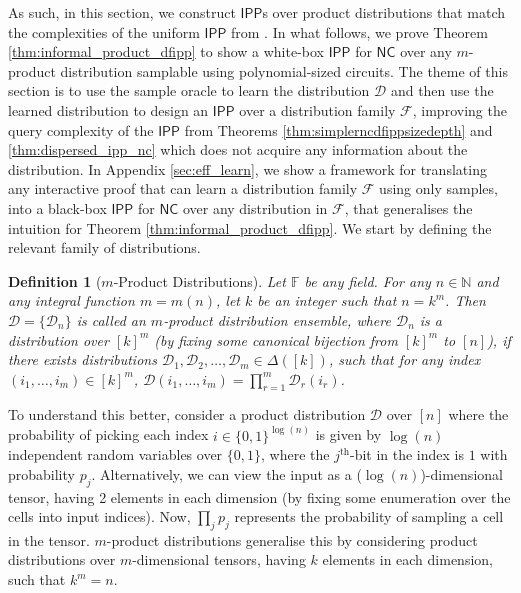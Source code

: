 \documentclass[11pt]{article}
\newtheorem{definition}{Definition}[section]
\newcommand{\NC}{\mathsf{NC}}
\newcommand{\IPP}{\mathsf{IPP}}
\newcommand{\F}{\mathbb{F}}
\newcommand{\N}{\mathbb{N}}
\newcommand{\sD}{\mathcal{D}}
\newcommand{\sF}{\mathcal{F}}
\begin{document}
As such, in this section, we construct $\IPP$s over product distributions that match the complexities of the uniform $\IPP$ from \cite{RVW}. In what follows, we prove Theorem \ref{thm:informal_product_dfipp} to show a white-box $\IPP$ for $\NC$ over any $m$-product distribution samplable using polynomial-sized circuits. The theme of this section is to use the sample oracle to learn the distribution $\sD$ and then use the learned distribution to design an $\IPP$ over a distribution family $\sF$, improving the query complexity of the $\IPP$ from Theorems \ref{thm:simplerncdfippsizedepth} and \ref{thm:dispersed_ipp_nc} which does not acquire any information about the distribution. In Appendix \ref{sec:eff_learn}, we show a framework for translating any interactive proof that can learn a distribution family $\sF$ using only samples, into a black-box $\IPP$ for $\NC$ over any distribution in $\sF$, that generalises the intuition for Theorem \ref{thm:informal_product_dfipp}. We start by defining the relevant family of distributions.


\begin{definition}[$m$-Product Distributions]
\label{def:prod_dist}
Let $\F$ be any field. For any $n \in \N$ and any integral function $m = m(n)$, let $k$ be an integer such that $n = k^m$. Then $\mathcal{D}=\{\sD_n\}$ is called an $m$-product distribution ensemble, where $\sD_n$ is a distribution over $[k]^m$ (by fixing some canonical bijection from $[k]^m$ to $[n]$), if there exists distributions $\sD_1, \sD_2, \dots, \sD_m \in \Delta([k])$, such that for any index $(i_1, \dots, i_m) \in [k]^m$, $\sD(i_1, \dots, i_m) = \prod_{r=1}^m \sD_r(i_r)$.
\end{definition}

To understand this better, consider a product distribution $\sD$ over $[n]$ where the probability of picking each index $i \in \{0,1\}^{\log(n)}$ is given by $\log(n)$ independent random variables over $\{0,1\}$, where the $j^{\text{th}}$-bit in the index is $1$ with probability $p_j$. Alternatively, we can view the input as a ($\log(n)$)-dimensional tensor, having 2 elements in each dimension (by fixing some enumeration over the cells into input indices). Now, $\prod_j p_j$ represents the probability of sampling a cell in the tensor. $m$-product distributions generalise this by considering product distributions over $m$-dimensional tensors, having $k$ elements in each dimension, such that $k^m = n$. 
\end{document}
